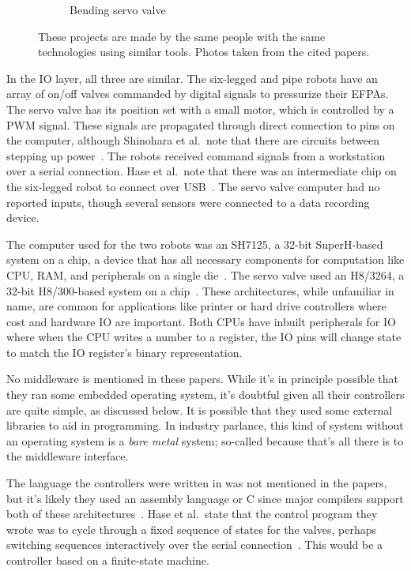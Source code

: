 \documentclass[english,12pt,a4paper,pdftex,eng,utf8]{aaltothesis}
\begin{document}
\begin{figure}[h]
\begin{subfigure}[t]{0.5\textwidth}
    \caption{Bending servo valve~\cite{Kobayashi2020}}\label{sfig:bending_servo_valve}
  \end{subfigure}
  \caption{These projects are made by the same people with the same technologies using similar tools.  Photos taken from the cited papers.}\label{fig:soft_pneumatic_actuators_demo}
\end{figure}

In the IO layer, all three are similar. The six-legged and pipe robots have an array of on/off valves commanded by digital signals to pressurize their EFPAs. The servo valve has its position set with a small motor, which is controlled by a PWM signal. These signals are propagated through direct connection to pins on the computer, although Shinohara et al.\ note that there are circuits between stepping up power~\cite{Shinohara2020}. The robots received command signals from a workstation over a serial connection. Hase et al.\ note that there was an intermediate chip on the six-legged robot to connect over USB~\cite{Hase2020}. The servo valve computer had no reported inputs, though several sensors were connected to a data recording device.

The computer used for the two robots was an SH7125, a 32-bit SuperH-based system on a chip, a device that has all necessary components for computation like CPU, RAM, and peripherals on a single die~\cite{SH7125}. The servo valve used an H8/3264, a 32-bit H8/300-based system on a chip~\cite{H83264}. These architectures, while unfamiliar in name, are common for applications like printer or hard drive controllers where cost and hardware IO are important. Both CPUs have inbuilt peripherals for IO where when the CPU writes a number to a register, the IO pins will change state to match the IO register's binary representation.

No middleware is mentioned in these papers. While it's in principle possible that they ran some embedded operating system, it's doubtful given all their controllers are quite simple, as discussed below. It is possible that they used some external libraries to aid in programming.  In industry parlance, this kind of system without an operating system is a \textit{bare metal} system; so-called because that's all there is to the middleware interface.

The language the controllers were written in was not mentioned in the papers, but it's likely they used an assembly language or C since major compilers support both of these architectures~\cite{GccSupportedArchitectures}. Hase et al.\ state that the control program they wrote was to cycle through a fixed sequence of states for the valves, perhaps switching sequences interactively over the serial connection~\cite{Hase2020}.  This would be a controller based on a finite-state machine.
\end{document}
